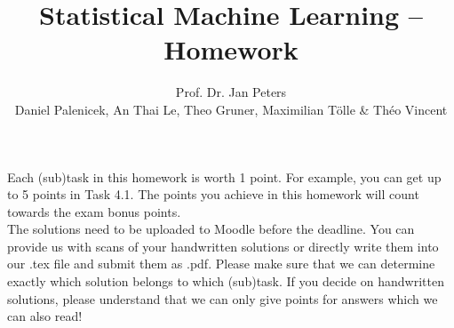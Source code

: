 \documentclass[
	ngerman,
	points=true,%
    solution=true,
    accentcolor=9c,
    colorbacktitle
	]{tudaexercise}
\begin{document}
\title[Homework 2/4]{Statistical Machine Learning -- Homework}
\author{Prof. Dr. Jan Peters \\ Daniel Palenicek, An Thai Le, Theo Gruner, Maximilian Tölle \& Théo Vincent}

\maketitle
Each (sub)task in this homework is worth 1 point. For example, you can get up to 5 points in Task 4.1. The points you achieve in this homework will count towards the exam bonus points. \\
The solutions need to be uploaded to Moodle before the deadline. You can provide us with scans of your handwritten solutions or directly write them into our .tex file and submit them as .pdf. Please make sure that we can determine exactly which solution belongs to which (sub)task. If you decide on handwritten solutions, please understand that we can only give points for answers which we can also read! 
\end{document}
